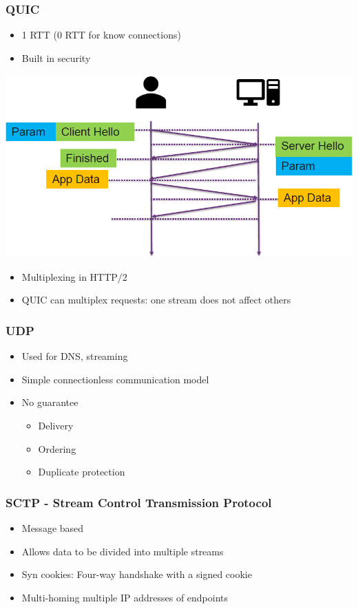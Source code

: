 \subsubsection{QUIC}
\begin{itemize}
    \item 1 RTT (0 RTT for know connections)
    \item Built in security
\end{itemize}
\includegraphics[width=0.8\linewidth]{../img/quic.png}
\begin{itemize}
    \item Multiplexing in HTTP/2
    \item QUIC can multiplex requests: one stream does not affect others
\end{itemize}

\subsubsection{UDP}
\begin{itemize}
    \item Used for DNS, streaming
    \item Simple connectionless communication model
    \item No guarantee
    \begin{itemize}
        \item Delivery
        \item Ordering
        \item Duplicate protection
    \end{itemize}
\end{itemize}

\subsubsection{SCTP - Stream Control Transmission Protocol}
\begin{itemize}
    \item Message based
    \item Allows data to be divided into multiple streams
    \item Syn cookies: Four-way handshake with a signed cookie
    \item Multi-homing multiple IP addresses of endpoints
\end{itemize}
